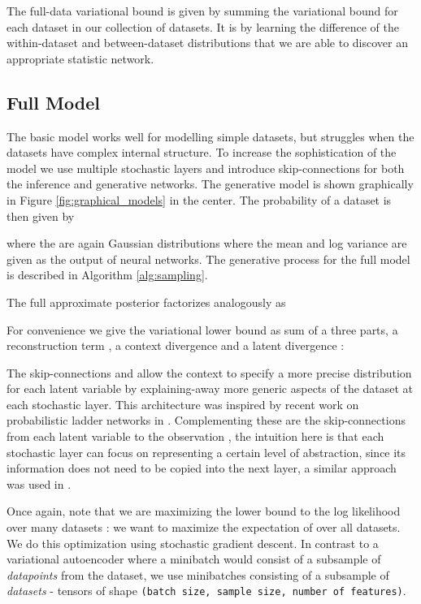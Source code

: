 \documentclass{article} \usepackage{iclr2017_conference,times}
\begin{document}
The full-data variational bound is given by summing the variational bound for each dataset in our collection of datasets. It is by learning the difference of the within-dataset and between-dataset distributions that we are able to discover an appropriate statistic network.

\subsection{Full Model}

The basic model works well for modelling simple datasets, but struggles when the datasets have complex internal structure. To increase the sophistication of the model we use multiple stochastic layers  and introduce skip-connections for both the inference and generative networks. The generative model is shown graphically in Figure \ref{fig:graphical_models} in the center. The probability of a dataset  is then given by


where the  are again Gaussian distributions where the mean and log variance are given as the output of neural networks. The generative process for the full model is described in Algorithm \ref{alg:sampling}.

The full approximate posterior factorizes analogously as 



For convenience we give the variational lower bound as sum of a three parts, a reconstruction term , a context divergence  and a latent divergence :


The skip-connections  and  allow the context to specify a more precise distribution  for each latent variable by explaining-away more generic aspects of the dataset at each stochastic layer. This architecture was inspired by recent work on probabilistic ladder networks in \citet{prob_ladder}. Complementing these are the skip-connections from each latent variable to the observation , the intuition here is that each stochastic layer can focus on representing a certain level of abstraction, since its information does not need to be copied into the next layer, a similar approach was used in \citet{auxiliary_ladder}.

Once again, note that we are maximizing the lower bound to the log likelihood over many datasets : we want to maximize the expectation of  over all datasets. We do this optimization using stochastic gradient descent. In contrast to a variational autoencoder where a minibatch would consist of a subsample of \emph{datapoints} from the dataset, we use minibatches consisting of a subsample of \emph{datasets} - tensors of shape \texttt{(batch size, sample size, number of features)}.
\end{document}
